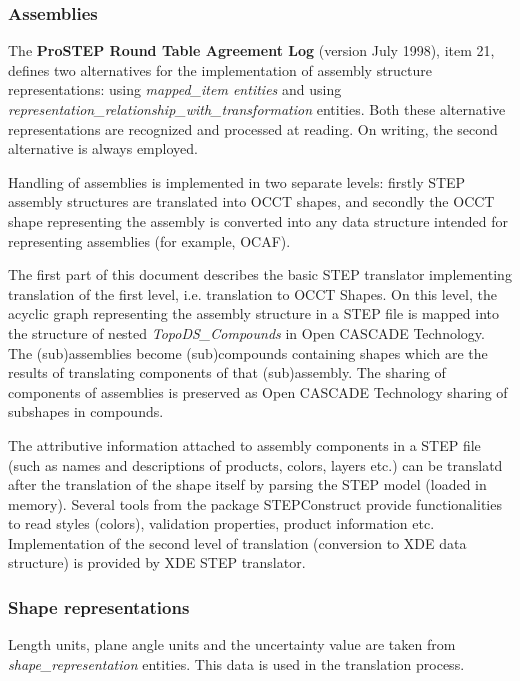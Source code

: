 \hypertarget{occt_user_guides__step_occt_step_2_2_1}{}\subsubsection{Assemblies}\label{occt_user_guides__step_occt_step_2_2_1}
The {\bfseries Pro\+S\+T\+EP Round Table Agreement Log} (version July 1998), item 21, defines two alternatives for the implementation of assembly structure representations\+: using {\itshape mapped\+\_\+item entities} and using {\itshape representation\+\_\+relationship\+\_\+with\+\_\+transformation} entities. Both these alternative representations are recognized and processed at reading. On writing, the second alternative is always employed.

Handling of assemblies is implemented in two separate levels\+: firstly S\+T\+EP assembly structures are translated into O\+C\+CT shapes, and secondly the O\+C\+CT shape representing the assembly is converted into any data structure intended for representing assemblies (for example, O\+C\+AF).

The first part of this document describes the basic S\+T\+EP translator implementing translation of the first level, i.\+e. translation to O\+C\+CT Shapes. On this level, the acyclic graph representing the assembly structure in a S\+T\+EP file is mapped into the structure of nested {\itshape Topo\+D\+S\+\_\+\+Compounds} in Open C\+A\+S\+C\+A\+DE Technology. The (sub)assemblies become (sub)compounds containing shapes which are the results of translating components of that (sub)assembly. The sharing of components of assemblies is preserved as Open C\+A\+S\+C\+A\+DE Technology sharing of subshapes in compounds.

The attributive information attached to assembly components in a S\+T\+EP file (such as names and descriptions of products, colors, layers etc.) can be translatd after the translation of the shape itself by parsing the S\+T\+EP model (loaded in memory). Several tools from the package S\+T\+E\+P\+Construct provide functionalities to read styles (colors), validation properties, product information etc. Implementation of the second level of translation (conversion to X\+DE data structure) is provided by X\+DE S\+T\+EP translator.\hypertarget{occt_user_guides__step_occt_step_2_2_2}{}\subsubsection{Shape representations}\label{occt_user_guides__step_occt_step_2_2_2}
Length units, plane angle units and the uncertainty value are taken from {\itshape shape\+\_\+representation} entities. This data is used in the translation process.

